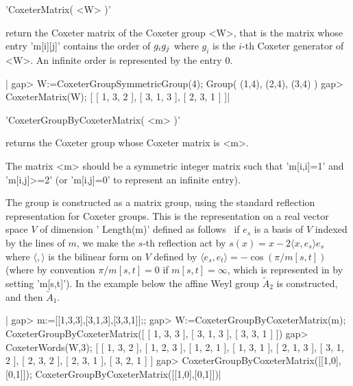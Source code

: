 
'CoxeterMatrix( <W> )'

return the Coxeter  matrix of the Coxeter group <W>,  that is the matrix
whose entry  'm[i][j]' contains the  order of $g_i\*g_j$ where  $g_i$ is
the $i$-th Coxeter generator of <W>. An infinite order is represented by
the entry 0.

|    gap> W:=CoxeterGroupSymmetricGroup(4);
    Group( (1,4), (2,4), (3,4) )
    gap> CoxeterMatrix(W);
    [ [ 1, 3, 2 ], [ 3, 1, 3 ], [ 2, 3, 1 ] ]|


'CoxeterGroupByCoxeterMatrix( <m> )'

returns  the  Coxeter  group  whose  Coxeter  matrix  is  <m>.

The  matrix <m> should  be a symmetric  integer matrix such that 'm[i,i]=1'
and 'm[i,j]>=2' (or 'm[i,j]=0' to represent an infinite entry).

The  group is constructed as a  matrix group, using the standard reflection
representation  for Coxeter  groups. This  is the  representation on a real
vector  space $V$ of dimension ' Length(m)' defined as follows \:\ if $e_s$
is  a  basis  of  $V$  indexed  by  the  lines  of  $m$, we make the $s$-th
reflection act by $s(x)=x-2\langle x, e_s\rangle e_s$ where
$\langle,\rangle$   is  the  bilinear  form  on  $V$  defined  by  $\langle
e_s,e_t\rangle=-\cos(\pi/m[s,t])$  (where  by  convention $\pi/m[s,t]=0$ if
$m[s,t]=\infty$,   which   is   represented   in   {\CHEVIE}   by   setting
'm[s,t]').  In the example below the  affine Weyl group $\tilde A_2$ is
constructed, and then $\tilde A_1$.

|    gap> m:=[[1,3,3],[3,1,3],[3,3,1]];;
    gap> W:=CoxeterGroupByCoxeterMatrix(m);
    CoxeterGroupByCoxeterMatrix([ [ 1, 3, 3 ], [ 3, 1, 3 ], [ 3, 3, 1 ] ])
    gap> CoxeterWords(W,3);
    [ [ 1, 3, 2 ], [ 1, 2, 3 ], [ 1, 2, 1 ], [ 1, 3, 1 ], [ 2, 1, 3 ],
      [ 3, 1, 2 ], [ 2, 3, 2 ], [ 2, 3, 1 ], [ 3, 2, 1 ] ]
    gap> CoxeterGroupByCoxeterMatrix([[1,0],[0,1]]);
    CoxeterGroupByCoxeterMatrix([[1,0],[0,1]])|


